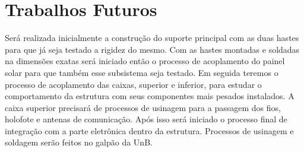 \chapter{Trabalhos Futuros}

Será realizada inicialmente a construção do suporte principal com as duas hastes para que já seja testado a rigidez do mesmo. Com as hastes montadas e soldadas na dimensões exatas será iniciado então o processo de acoplamento do painel solar para que também esse subsistema seja testado. Em seguida teremos o processo de acoplamento das caixas, superior e inferior, para estudar o comportamento da estrutura com seus componentes mais pesados instalados. A caixa superior precisará de processos de usinagem para a passagem dos fios, holofote e antenas de comunicação. Após isso será iniciado o processo final de integração com a parte eletrônica dentro da estrutura. Processos de usinagem e soldagem serão feitos no galpão da UnB.





